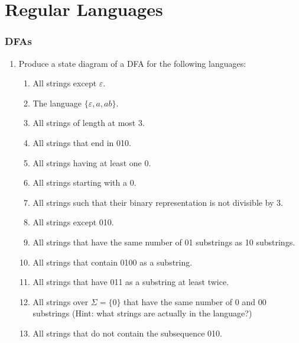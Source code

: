 \part{Regular Languages}

\section{DFAs}
\begin{enumerate}
\item Produce a state diagram of a DFA for the following languages:
\begin{enumerate} 

\item {} All strings except $\varepsilon$.

\item {} The language $\{\varepsilon, a, ab\}$.

\item {} All strings of length at most 3.

\item {} All strings that end in 010.

\item \label{ex2017prod1}  All strings having at least one 0.

\item \label{ex2017fprod1}  All strings starting with a 0.

\item \label{ex2017prod2}  All strings such that their binary representation is not divisible by 3.

\item {} All strings except 010.

\item {} All strings that have the same number of 01 substrings as 10 substrings.

\item {} All strings that contain 0100 as a substring.

\item {} All strings that have 011 as a substring at least twice.

\item {} All strings over $\Sigma = \{0\}$ that have the same number of 0 and 00 substrings (Hint: what strings are actually in the language?)

\item \label{ex2017fprod2}   All strings that do not contain the subsequence 010.


\end{enumerate}
\end{enumerate}
